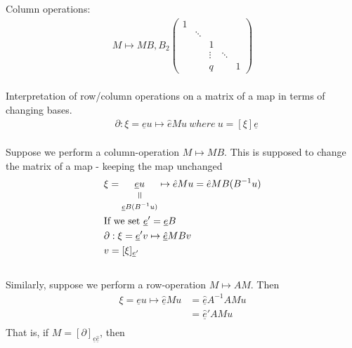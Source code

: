 \documentclass[11pt,a4paper]{report}
\newcommand{\verteq}{\rotatebox{90}{$\,=$}}
\newcommand{\equalto}[2]{\underset{\scriptstyle\overset{\mkern4mu\verteq}{#2}}{#1}}
\begin{document}
              Column operations:
              \begin{align*}
                M \mapsto MB, B_2\begin{pmatrix}1&&&& \\ & \ddots &&& \\ && 1 && \\ && \vdots & \ddots & \\ && q && 1 \end{pmatrix}
              \end{align*}
              \\
              Interpretation of row/column operations on a matrix of a map in terms of changing bases.
              \begin{align*}
                &\partial: \xi = \underline{e}u \mapsto \hat{e} M u
                \ where\ u = [\xi]\underline{e}
              \end{align*}
              \\
              Suppose we perform a column-operation $M \mapsto MB$. This is supposed to change the matrix of a map - keeping the map unchanged
              \begin{align*}
                &\xi = \equalto{\underline{e}u}{\underline{e} B (B^{-1}u)} \mapsto \hat{e} M u = \hat{e} M B (B^{-1}u)\\
                &\textrm{If we set } \underline{e}' = \underline{e}B\\
                &\partial: \xi = \underline{e}' v \mapsto \underline{\hat{e}} MB v\\
                &v = [\xi]_{\underline{e}'}
              \end{align*}
              \\
              Similarly, suppose we perform a row-operation $M \mapsto AM$. Then
              \begin{align*}
                \xi = \underline{e}u \mapsto \underline{\hat{e}}Mu &= \underline{\hat{e}}A^{-1}AMu\\
                                                           &= \underline{\hat{e}}'AMu\\
              \end{align*}
              That is, if $M = [\partial]_{\underline{e}\underline{\hat{e}}}$, then
\end{document}
